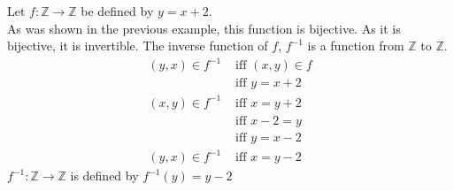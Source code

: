 \documentclass[../notes.tex]{subfiles}
\begin{document}
				\begin{example}
					Let $f: \mathbb{Z} \rightarrow \mathbb{Z}$ be defined by $y = x + 2$.\\
					As was shown in the previous example, this function is bijective. As it is bijective, it is invertible. The inverse function of $f$, $f^{-1}$ is a function from $\mathbb{Z}$ to $\mathbb{Z}$.
					\begin{align*}
						(y, x) \in f^{-1} &\text{ iff } (x, y) \in f\\
						& \text{ iff } y = x + 2\\
						(x, y) \in f^{-1} &\text{ iff } x = y + 2 \tag*{(swap variables)}\\
						&\text{ iff } x - 2 = y \tag*{(solve for $y$)}\\
						&\text{ iff } y = x - 2\\
						(y, x) \in f^{-1} & \text{ iff } x = y - 2 \tag*{(swap variables back)}
					\end{align*}
					$f^{-1}: \mathbb{Z} \rightarrow \mathbb{Z}$ is defined by $f^{-1}(y) = y - 2$
				\end{example}
\end{document}
